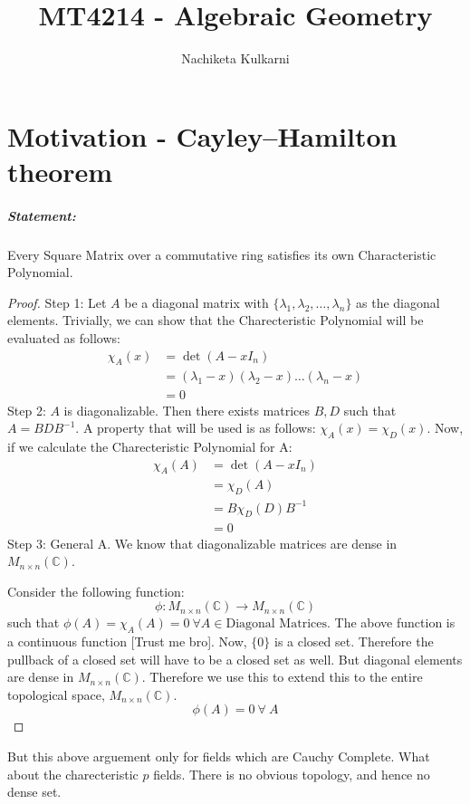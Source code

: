 \documentclass[12pt, oneside]{book}
\date{}
\title{MT4214 - Algebraic Geometry}
\author{Nachiketa Kulkarni}
\begin{document}
\maketitle
\tableofcontents

\mainmatter
\chapter{Motivation - Cayley–Hamilton theorem}
\paragraph{Statement:} Every Square Matrix over a commutative ring satisfies its own Characteristic Polynomial.

\begin{proof}

    Step 1: Let \(A\) be a diagonal matrix with \(\{\lambda_1, \lambda_2, \dots, \lambda_n\}\) as the diagonal elements.
    Trivially, we can show that the Charecteristic Polynomial will be evaluated as follows:
    \begin{align*}
        \chi_A (x) &= \det(A - xI_n)\\
        &= (\lambda_1 - x)(\lambda_2 - x)\dots(\lambda_n - x)\\
        &= 0
    \end{align*}
    Step 2: \(A\) is diagonalizable.
    Then there exists matrices \(B, D\) such that \(A = BDB^{-1}\).
    A property that will be used is as follows: \(\chi_A(x) = \chi_D(x)\).
    Now, if we calculate the Charecteristic Polynomial for A:
    \begin{align*}
        \chi_A (A) &= \det(A - xI_n)\\
        &= \chi_D(A)\\
        &= B \chi_D (D) B^{-1}\\
        &= 0
    \end{align*}
    Step 3: General A.
    We know that diagonalizable matrices are dense in \(M_{n\times n}(\mathbb{C})\).

    Consider the following function:
    \[\phi : M_{n\times n}(\mathbb{C}) \rightarrow M_{n\times n}(\mathbb{C})\]
    such that \(\phi(A) = \chi_A(A) = 0 \: \forall A \in \text{Diagonal Matrices}\).
    The above function is a continuous function [Trust me bro].
    Now, \(\{0\}\) is a closed set.
    Therefore the pullback of a closed set will have to be a closed set as well.
    But diagonal elements are dense in \(M_{n\times n}(\mathbb{C})\).
    Therefore we use this to extend this to the entire topological space, \(M_{n\times n}(\mathbb{C})\).
    \[\phi(A) = 0 \: \forall \: A\]
\end{proof}
But this above arguement only for fields which are Cauchy Complete.
What about the charecteristic \(p\) fields.
There is no obvious topology, and hence no dense set.
\end{document}
